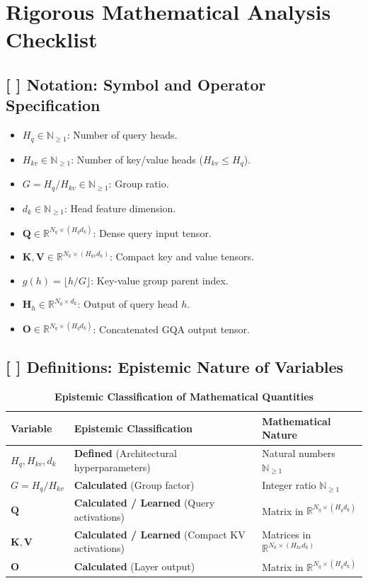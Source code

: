 \documentclass[11pt,a4paper]{article}
\theoremstyle{definition}
\begin{document}
\section{Rigorous Mathematical Analysis Checklist}

\subsection{[ ] Notation: Symbol and Operator Specification}
\begin{itemize}
    \item $H_q \in \mathbb{N}_{\ge 1}$: Number of query heads.
    \item $H_{kv} \in \mathbb{N}_{\ge 1}$: Number of key/value heads ($H_{kv} \le H_q$).
    \item $G = H_q / H_{kv} \in \mathbb{N}_{\ge 1}$: Group ratio.
    \item $d_k \in \mathbb{N}_{\ge 1}$: Head feature dimension.
    \item $\mathbf{Q} \in \mathbb{R}^{N_q \times (H_q d_k)}$: Dense query input tensor.
    \item $\mathbf{K}, \mathbf{V} \in \mathbb{R}^{N_k \times (H_{kv} d_k)}$: Compact key and value tensors.
    \item $g(h) = \lfloor h / G \rfloor$: Key-value group parent index.
    \item $\mathbf{H}_h \in \mathbb{R}^{N_q \times d_k}$: Output of query head $h$.
    \item $\mathbf{O} \in \mathbb{R}^{N_q \times (H_q d_k)}$: Concatenated GQA output tensor.
\end{itemize}

\subsection{[ ] Definitions: Epistemic Nature of Variables}
\begin{table}[h]
\centering
\caption{\textbf{Epistemic Classification of Mathematical Quantities}}
\begin{tabular}{lll}
\toprule
\textbf{Variable} & \textbf{Epistemic Classification} & \textbf{Mathematical Nature} \\
\midrule
$H_q, H_{kv}, d_k$ & \textbf{Defined} (Architectural hyperparameters) & Natural numbers $\mathbb{N}_{\ge 1}$ \\
$G = H_q / H_{kv}$ & \textbf{Calculated} (Group factor) & Integer ratio $\mathbb{N}_{\ge 1}$ \\
$\mathbf{Q}$ & \textbf{Calculated / Learned} (Query activations) & Matrix in $\mathbb{R}^{N_q \times (H_q d_k)}$ \\
$\mathbf{K}, \mathbf{V}$ & \textbf{Calculated / Learned} (Compact KV activations) & Matrices in $\mathbb{R}^{N_k \times (H_{kv} d_k)}$ \\
$\mathbf{O}$ & \textbf{Calculated} (Layer output) & Matrix in $\mathbb{R}^{N_q \times (H_q d_k)}$ \\
\bottomrule
\end{tabular}
\end{table}
\end{document}
